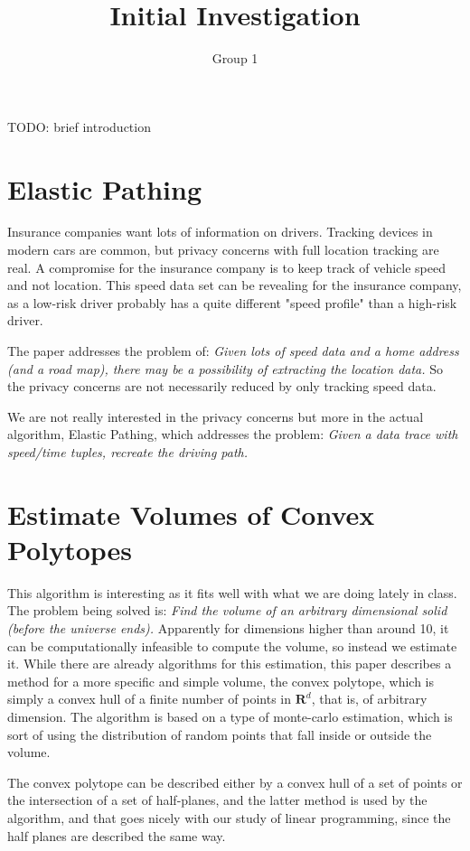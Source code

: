 \documentclass[11pt]{article}
\title{Initial Investigation}
\author{Group 1}
\begin{document}
\maketitle

TODO: brief introduction

\section{Elastic Pathing\cite{Firner}}
Insurance companies want lots of information on drivers. Tracking devices in modern cars are common, but privacy concerns with full location tracking are real. A compromise for the insurance company is to keep track of vehicle speed and not location. This speed data set can be revealing for the insurance company, as a low-risk driver probably has a quite different "speed profile" than a high-risk driver.

The paper addresses the problem of:  {\em Given lots of speed data and a home address (and a road map), there may be a possibility of extracting the location data.}  So the privacy concerns are not necessarily reduced by only tracking speed data.

We are not really interested in the privacy concerns but more in the actual algorithm, Elastic Pathing, which addresses the problem:
{\em Given a data trace with speed/time tuples, recreate the driving path.}

\section{Estimate Volumes of Convex Polytopes\cite{Ge}}
This algorithm is interesting as it fits well with what we are doing lately in class. The problem being solved is:  {\em Find the volume of an arbitrary dimensional solid (before the universe ends).}  Apparently for dimensions higher than around 10, it can be computationally infeasible to compute the volume, so instead we estimate it. While there are already algorithms for this estimation, this paper describes a method for a more specific and simple volume, the convex polytope, which is simply a convex hull of a finite number of points in $\mathbf{R}^d$, that is, of arbitrary dimension.
The algorithm is based on a type of monte-carlo estimation, which is sort of using the distribution of random points that fall inside or outside the volume.

The convex polytope can be described either by a convex hull of a set of points or the intersection of a set of half-planes, and the latter method is used by the algorithm, and that goes nicely with our study of linear programming, since the half planes are described the same way.
\end{document}
